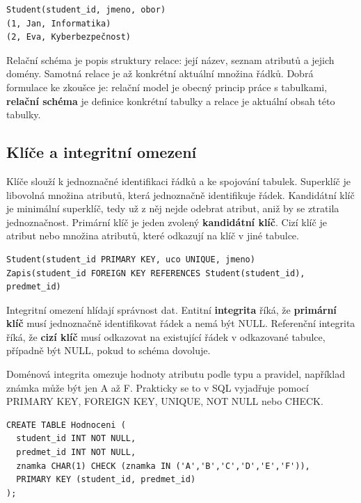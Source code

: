\begin{codebox}
\small
\begin{verbatim}
Student(student_id, jmeno, obor)
(1, Jan, Informatika)
(2, Eva, Kyberbezpečnost)
\end{verbatim}
\end{codebox}

Relační schéma je popis struktury relace: její název, seznam atributů a jejich domény. Samotná relace je až konkrétní aktuální množina řádků. Dobrá formulace ke zkoušce je: relační model je obecný princip práce s tabulkami, \textbf{relační schéma} je definice konkrétní tabulky a relace je aktuální obsah této tabulky.

\subsection*{Klíče a integritní omezení}

Klíče slouží k jednoznačné identifikaci řádků a ke spojování tabulek. Superklíč je libovolná množina atributů, která jednoznačně identifikuje řádek. Kandidátní klíč je minimální superklíč, tedy už z něj nejde odebrat atribut, aniž by se ztratila jednoznačnost. Primární klíč je jeden zvolený \textbf{kandidátní klíč}. Cizí klíč je atribut nebo množina atributů, které odkazují na klíč v jiné tabulce.

\begin{codebox}
\small
\begin{verbatim}
Student(student_id PRIMARY KEY, uco UNIQUE, jmeno)
Zapis(student_id FOREIGN KEY REFERENCES Student(student_id), predmet_id)
\end{verbatim}
\end{codebox}

Integritní omezení hlídají správnost dat. Entitní \textbf{integrita} říká, že \textbf{primární klíč} musí jednoznačně identifikovat řádek a nemá být NULL. Referenční integrita říká, že \textbf{cizí klíč} musí odkazovat na existující řádek v odkazované tabulce, případně být NULL, pokud to schéma dovoluje.

Doménová integrita omezuje hodnoty atributu podle typu a pravidel, například známka může být jen A až F. Prakticky se to v SQL vyjadřuje pomocí PRIMARY KEY, FOREIGN KEY, UNIQUE, NOT NULL nebo CHECK.

\begin{codebox}
\small
\begin{verbatim}
CREATE TABLE Hodnoceni (
  student_id INT NOT NULL,
  predmet_id INT NOT NULL,
  znamka CHAR(1) CHECK (znamka IN ('A','B','C','D','E','F')),
  PRIMARY KEY (student_id, predmet_id)
);
\end{verbatim}
\end{codebox}

